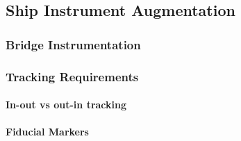 \subsection{Ship Instrument Augmentation}

\subsubsection{Bridge Instrumentation}

\subsubsection{Tracking Requirements}

\paragraph{In-out vs out-in tracking}

\paragraph{Fiducial Markers}

